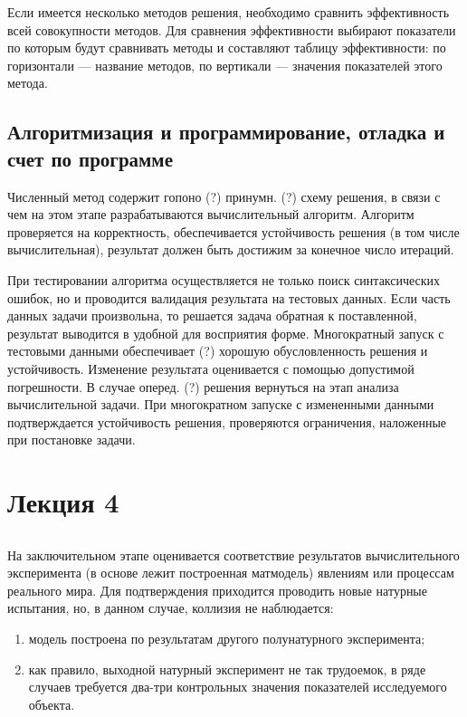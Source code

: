 \documentclass[12pt]{article}
\begin{document}
Если имеется несколько методов решения, необходимо сравнить эффективность всей совокупности методов. Для сравнения эффективности выбирают показатели по которым будут сравнивать методы и составляют таблицу эффективности: по горизонтали --- название методов, по вертикали --- значения показателей этого метода.

\subsection{Алгоритмизация и программирование, отладка и счет по программе}

Численный метод содержит гопоно (?) принумн. (?) схему решения, в связи с чем на этом этапе разрабатываются вычислительный алгоритм. Алгоритм проверяется на корректность, обеспечивается устойчивость решения (в том числе вычислительная), результат должен быть достижим за конечное число итераций.

При тестировании алгоритма осуществляется не только поиск синтаксических ошибок, но и проводится валидация результата на тестовых данных. Если часть данных задачи произвольна, то решается задача обратная к поставленной, результат выводится в удобной для восприятия форме. Многократный запуск с тестовыми данными обеспечивает (?) хорошую обусловленность решения и устойчивость. Изменение результата оценивается с помощью допустимой погрешности. В случае оперед. (?) решения вернуться на этап анализа вычислительной задачи. При многократном запуске с измененными данными подтверждается устойчивость решения, проверяются ограничения, наложенные при постановке задачи.

\newpage
\section{Лекция 4}
\subsection{}

На заключительном этапе оценивается соответствие результатов вычислительного эксперимента (в основе лежит построенная матмодель) явлениям или процессам реального мира. Для подтверждения приходится проводить новые натурные испытания, но, в данном случае, коллизия не наблюдается:

\begin{enumerate}
    \item модель построена по результатам другого полунатурного эксперимента;
    \item как правило, выходной натурный эксперимент не так трудоемок, в ряде случаев требуется два-три контрольных значения показателей исследуемого объекта.
\end{enumerate}
\end{document}
